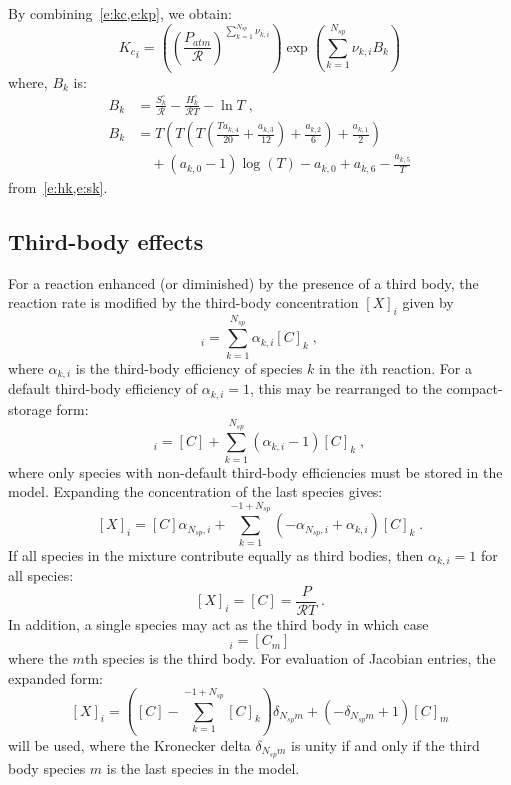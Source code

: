 \documentclass[12pt]{article}
\newcommand{\ns}{\ensuremath{{N_{sp}}}}
\newcommand{\Ru}{\ensuremath{\mathcal{R}}}
\begin{document}
By combining~\cref{e:kc,e:kp}, we obtain:
\begin{equation}
 \label{e:kc_in_kp}
 {K_c}_{i} = \left(\left(\frac{P_{atm}}{\Ru}\right)^{\sum_{k=1}^{\ns} \nu_{k,i}}\right) \operatorname{exp}\left({\sum_{k=1}^{\ns} \nu_{k,i} B_{k}}\right)
\end{equation}
where, $B_k$ is:
\begin{align}
 \label{e:Bk}
 B_{k} &= \frac{S^{\circ}_k}{\Ru} - \frac{H^{\circ}_k}{\Ru T} - \ln{T} \nonumber\; , \\
 B_{k} &= T \left(T \left(T \left(\frac{T a_{k,4}}{20} + \frac{a_{k,3}}{12}\right) + \frac{a_{k,2}}{6}\right) + \frac{a_{k,1}}{2}\right) \nonumber \\
       & \quad + \left(a_{k,0} - 1\right) \log{\left (T \right )} - a_{k,0} + a_{k,6} - \frac{a_{k,5}}{T}
\end{align}
from~\cref{e:hk,e:sk}.

\subsection{Third-body effects}
\label{s:thdbody}

For a reaction enhanced (or diminished) by the presence of a third body, the reaction rate is modified by the third-body concentration $[X]_i$ given by
\begin{equation}
[X]_{i} = \sum_{k=1}^{\ns} \alpha_{k,i} [C]_{k} \;,
\end{equation}
where $\alpha_{k,i}$ is the third-body efficiency of species $k$ in the $i$th reaction.
For a default third-body efficiency of $\alpha_{k,i} = 1$, this may be rearranged to the compact-storage form:
\begin{equation}
 [X]_{i} = [C] + \sum_{k=1}^{\ns} \left(\alpha_{k,i} - 1\right) [C]_{k} \;,
\end{equation}
where only species with non-default third-body efficiencies must be stored in the model.
Expanding the concentration of the last species gives:
\begin{equation}
\label{e:thd_mix}
 [X]_{i}=[C] \alpha_{\ns,i} + \sum_{k=1}^{-1 + \ns} \left(- \alpha_{\ns,i} + \alpha_{k,i}\right) [C]_{k}\;.
\end{equation}
If all species in the mixture contribute equally as third bodies, then $\alpha_{k,i} = 1$ for all species:
\begin{equation}
\label{e:thd_unity}
 [X]_{i} = [C] = \frac{P}{\Ru T} \;.
\end{equation}
In addition, a single species may act as the third body in which case
\begin{equation}
 [X]_{i} = [C_m]
\end{equation}
where the $m$th species is the third body.
For evaluation of Jacobian entries, the expanded form:
\begin{equation}
\label{e:thd_spec}
 [X]_{i}=\left([C] - \sum_{k=1}^{-1 + \ns} [C]_{k}\right) \delta_{\ns m} + \left(- \delta_{\ns m} + 1\right) [C]_{m}
\end{equation}
will be used, where the Kronecker delta $\delta_{\ns m}$ is unity if and only if the third body species $m$ is the last species in the model.
\end{document}
